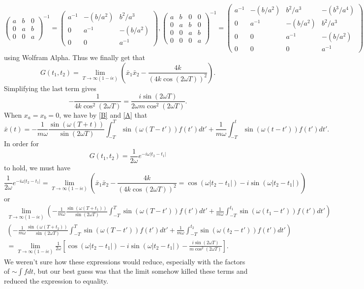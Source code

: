 \begin{equation}
    \begin{pmatrix} a & b & 0 \\ 0 & a & b \\ 0 & 0 & a\end{pmatrix}^{-1}=\begin{pmatrix} a^{-1}& -(b/a^2) & b^2/a^3 \\  0 & a^{-1} & -(b/a^2) \\ 0 & 0 & a^{-1} \end{pmatrix}, \begin{pmatrix} a & b & 0 & 0\\ 0 & a & b & 0\\ 0 & 0 & a & b \\ 0 & 0 & 0 & a\end{pmatrix}^{-1}=\begin{pmatrix} a^{-1}& -(b/a^2) & b^2/a^3 & -(b^3/a^4)\\  0 & a^{-1} & -(b/a^2) & b^2/a^3\\ 0 & 0 & a^{-1} & -(b/a^2)\\ 0 & 0 & 0 & a^{-1} \end{pmatrix}
\end{equation}
using Wolfram Alpha. Thus we finally get that 
\begin{equation}
    G(t_1,t_2)=\lim_{T\to \infty(1-i\epsilon)}(\bar x_1 \bar x_2-\frac{4k}{(4k\cos(2\omega T))^2}).
\end{equation}
Simplifying the last term gives
\begin{equation}
    -\frac{1}{4k\cos^2(2\omega T)}=\frac{i\sin(2\omega T)}{2\omega m \cos^2(2\omega T)}.
\end{equation}
When $x_a=x_b=0$, we have by \eqref{B} and \eqref{A} that 
\begin{equation}
    \bar x (t)= -\frac 1 {m\omega} \frac{\sin(\omega(T+t))}{\sin(2\omega T)}\int_{-T}^T \sin(\omega(T-t'))f(t')dt'+\frac 1 {m\omega}\int_{-T}^t \sin(\omega(t-t'))f(t')dt'.
\end{equation}
In order for 
\begin{equation}
    G(t_1,t_2)=\frac 1 {2\omega} e^{-i\omega|t_2-t_1|}
\end{equation}
to hold, we must have
\begin{equation}
    \frac 1 {2\omega} e^{-i\omega|t_2-t_1|}=\lim_{T\to \infty(1-i\epsilon)}\left(\bar x_1 \bar x_2-\frac{4k}{(4k\cos(2\omega T))^2}=\cos(\omega|t_2-t_1|)-i\sin(\omega|t_2-t_1|)\right)
\end{equation}
or 
\begin{align}
    \lim_{T\to \infty(1-i\epsilon)}\left(-\frac 1 {m\omega} \frac{\sin(\omega(T+t_1))}{\sin(2\omega T)}\int_{-T}^T \sin(\omega(T-t'))f(t')dt'+\frac 1 {m\omega}\int_{-T}^{t_1} \sin(\omega(t_1-t'))f(t')dt'\right)\\\left(-\frac 1 {m\omega} \frac{\sin(\omega(T+t_2))}{\sin(2\omega T)}\int_{-T}^T \sin(\omega(T-t'))f(t')dt'+\frac 1 {m\omega}\int_{-T}^{t_2} \sin(\omega(t_2-t'))f(t')dt'\right)\\=\lim_{T\to \infty(1-i\epsilon)}\frac 1 {2\omega}\left[ \cos(\omega|t_2-t_1|)-i\sin(\omega|t_2-t_1|)-\frac{i\sin(2\omega T)}{m \cos^2(2\omega T)}\right ].
\end{align}
We weren't sure how these expressions would reduce, especially with the factors of $\sim \int f dt$, but our best guess was that the limit somehow killed these terms and reduced the expression to equality.